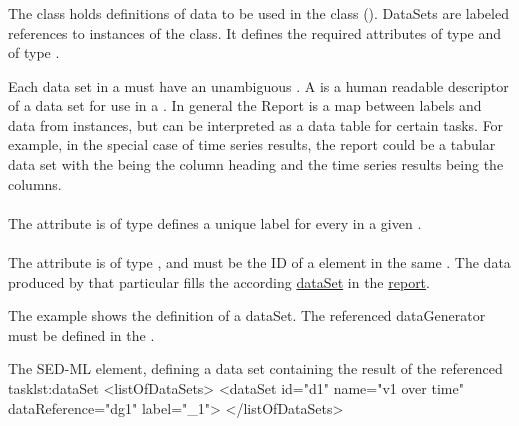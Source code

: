 \begin{blockChanged}
\subsubsection{}
\label{class:dataSet}
The \DataSet class holds definitions of data to be used in the \Report class (). DataSets are labeled references to instances of the \DataGenerator class.  It defines the required attributes  of type  and  of type \SIdRef.  

Each data set in a \Report must have an unambiguous . A  is a human readable descriptor of a data set for use in a \Report.  In general the Report is a map between labels and data from \DataGenerator instances, but can be interpreted as a data table for certain tasks. For example, in the special case of time series results, the report could be a tabular data set with the  being the column heading and the time series results being the columns.

\paragraph*{}
\label{sec:label}
The  attribute is of type  defines a unique label for every \DataSet in a given \Report.

\paragraph*{}
\label{sec:dataReference}
The  attribute is of type \SIdRef, and must be the ID of a \DataGenerator element in the same \SedDocument.  The data produced by that particular \DataGenerator fills the according \hyperref[class:dataSet]{dataSet} in the \hyperref[class:report]{report}.

The example shows the definition of a dataSet. The referenced dataGenerator  must be defined in the \hyperref[class:listOfDataGenerators]{}.
\begin{myXmlLst}{The SED-ML  element, defining a data set containing the result of the referenced task}{lst:dataSet}
<listOfDataSets>
	<dataSet id="d1" name="v1 over time" dataReference="dg1" label="_1">
</listOfDataSets>
\end{myXmlLst}


\end{blockChanged}

